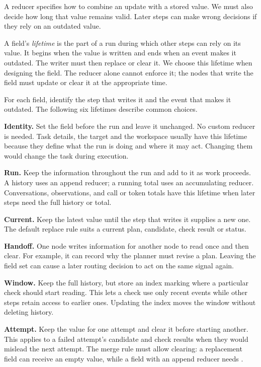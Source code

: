 A reducer specifies how to combine an update with a stored value. We must also decide how long
that value remains valid. Later steps can make wrong decisions if they rely on an outdated
value.

A field's \emph{lifetime} is the part of a run during which other steps can rely on its value.
It begins when the value is written and ends when an event makes it outdated. The writer must
then replace or clear it. We choose this lifetime when designing the field. The reducer alone
cannot enforce it; the nodes that write the field must update or clear it at the appropriate time.

For each field, identify the step that writes it and the event that makes it outdated. The
following six lifetimes describe common choices.

\bi

\item \textbf{Identity.} Set the field before the run and leave it unchanged. No custom reducer
is needed. Task details, the target and the workspace usually have this lifetime because they
define what the run is doing and where it may act. Changing them would change the task during
execution.

\item \textbf{Run.} Keep the information throughout the run and add to it as work proceeds. A
history uses an append reducer; a running total uses an accumulating reducer. Conversations,
observations, and call or token totals have this lifetime when later steps need the full
history or total.

\item \textbf{Current.} Keep the latest value until the step that writes it supplies a new one.
The default replace rule suits a current plan, candidate, check result or status.

\item \textbf{Handoff.} One node writes information for another node to read once and then clear.
For example, it can record why the planner must revise a plan. Leaving the field set can cause
a later routing decision to act on the same signal again.

\item \textbf{Window.} Keep the full history, but store an index marking where a particular
check should start reading. This lets a check use only recent events while other steps retain
access to earlier ones. Updating the index moves the window without deleting history.

\item \textbf{Attempt.} Keep the value for one attempt and clear it before starting another.
This applies to a failed attempt's candidate and check results when they would mislead the
next attempt. The merge rule must allow clearing: a replacement field can receive an empty
value, while a field with an append reducer needs .

